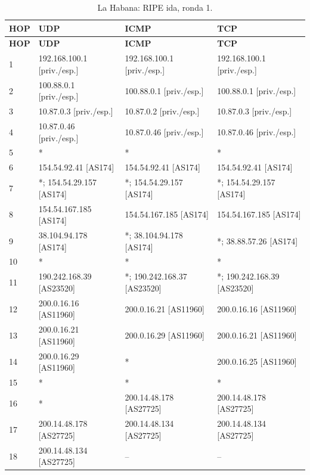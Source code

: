 \endgroup
\begingroup
\fontsize{9}{11}\selectfont
\begin{longtable}{p{0.95cm}p{4.716666666666667cm}p{4.716666666666667cm}p{4.716666666666667cm}}
\caption{La Habana: RIPE ida, ronda 1.}\label{anexo:ripe:200.14.48.134:1} \\
\toprule
\textbf{HOP} & \textbf{UDP} & \textbf{ICMP} & \textbf{TCP} \\ \midrule
\endfirsthead
\toprule
\textbf{HOP} & \textbf{UDP} & \textbf{ICMP} & \textbf{TCP} \\ \midrule
\endhead
1 & 192.168.100.1 [priv./esp.] & 192.168.100.1 [priv./esp.] & 192.168.100.1 [priv./esp.] \\
2 & 100.88.0.1 [priv./esp.] & 100.88.0.1 [priv./esp.] & 100.88.0.1 [priv./esp.] \\
3 & 10.87.0.3 [priv./esp.] & 10.87.0.2 [priv./esp.] & 10.87.0.3 [priv./esp.] \\
4 & 10.87.0.46 [priv./esp.] & 10.87.0.46 [priv./esp.] & 10.87.0.46 [priv./esp.] \\
5 & * & * & * \\
6 & 154.54.92.41 [AS174] & 154.54.92.41 [AS174] & 154.54.92.41 [AS174] \\
7 & *; 154.54.29.157 [AS174] & *; 154.54.29.157 [AS174] & *; 154.54.29.157 [AS174] \\
8 & 154.54.167.185 [AS174] & 154.54.167.185 [AS174] & 154.54.167.185 [AS174] \\
9 & 38.104.94.178 [AS174] & *; 38.104.94.178 [AS174] & *; 38.88.57.26 [AS174] \\
10 & * & * & * \\
11 & 190.242.168.39 [AS23520] & *; 190.242.168.37 [AS23520] & *; 190.242.168.39 [AS23520] \\
12 & 200.0.16.16 [AS11960] & 200.0.16.21 [AS11960] & 200.0.16.16 [AS11960] \\
13 & 200.0.16.21 [AS11960] & 200.0.16.29 [AS11960] & 200.0.16.21 [AS11960] \\
14 & 200.0.16.29 [AS11960] & * & 200.0.16.25 [AS11960] \\
15 & * & * & * \\
16 & * & 200.14.48.178 [AS27725] & 200.14.48.178 [AS27725] \\
17 & 200.14.48.178 [AS27725] & 200.14.48.134 [AS27725] & 200.14.48.134 [AS27725] \\
18 & 200.14.48.134 [AS27725] & -- & -- \\
\bottomrule
\end{longtable}
\endgroup
\begingroup
\fontsize{9}{11}\selectfont
